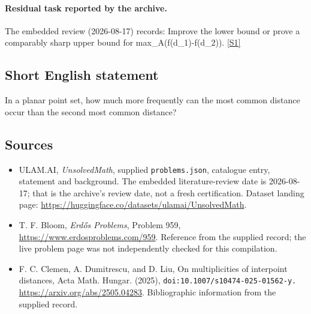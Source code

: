 \documentclass[11pt,a4paper]{article}
\newcommand{\sref}[2]{\hyperlink{source:#1:#2}{[S#2]}}
\begin{document}
\paragraph{Residual task reported by the archive.}

The embedded review (2026-08-17) records: Improve the lower bound or prove a comparably sharp upper bound for max\_A(f(d\_1)-f(d\_2)). \sref{statement}{1}

\subsection{Short English statement}

In a planar point set, how much more frequently can the most common distance occur than the second most common distance?

\subsection{Sources}

{\small

\begin{itemize}

\item[\hypertarget{source:statement:1}{S1}] ULAM.AI, \emph{UnsolvedMath}, supplied \texttt{problems.json}, catalogue entry, statement and background. The embedded literature-review date is 2026-08-17; that is the archive’s review date, not a fresh certification. Dataset landing page: \url{https://huggingface.co/datasets/ulamai/UnsolvedMath}.

\item[\hypertarget{source:statement:2}{S2}] T. F. Bloom, \emph{Erdős Problems}, Problem 959, \url{https://www.erdosproblems.com/959}. Reference from the supplied record; the live problem page was not independently checked for this compilation.

\item[\hypertarget{source:statement:3}{S3}] F. C. Clemen, A. Dumitrescu, and D. Liu, On multiplicities of interpoint distances, Acta Math. Hungar. (2025), \nolinkurl{doi:10.1007/s10474-025-01562-y.} \url{https://arxiv.org/abs/2505.04283}. Bibliographic information from the supplied record.

\end{itemize}

}

\label{end:statement}
\end{document}
